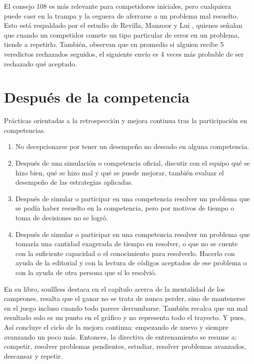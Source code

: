 El consejo 108 es más relevante para competidores iniciales, pero cualquiera puede caer en la trampa y la ceguera de aferrarse a un problema mal resuelto. Esto está respaldado por el estudio de Revilla, Manzoor y Lui \cite{revilla2008}, quienes señalan que cuando un competidor comete un tipo particular de error en un problema, tiende a repetirlo. También, observan que en promedio si alguien recibe 5 veredictos rechazados seguidos, el siguiente envío es 4 veces más probable de ser rechazado qué aceptado.
\pagebreak
\section{Después de la competencia}
Prácticas orientadas a la retrospección y mejora continua tras la participación en competencias.
\begin{enumerate}[resume=icpc]
    \item No decepcionarse por tener un desempeño no deseado en alguna competencia.
    \item Después de una simulación o competencia oficial, discutir con el equipo qué se hizo bien, qué se hizo mal y qué se puede mejorar, también evaluar el desempeño de las estrategias aplicadas.
    \item Después de simular o participar en una competencia resolver un problema que se podía haber resuelto en la competencia, pero por motivos de tiempo o toma de decisiones no se logró.
    \item Después de simular o participar en una competencia resolver un problema que tomaría una cantidad exagerada de tiempo en resolver, o que no se cuente con la suficiente capacidad o el conocimiento para resolverlo. Hacerlo con ayuda de la editorial y con la lectura de códigos aceptados de ese problema o con la ayuda de otra persona que sí lo resolvió.
\end{enumerate}
En su libro, soullless \cite{soullless2025} destaca en el capítulo acerca de la mentalidad de los campeones, resalta que el ganar no se trata de nunca perder, sino de mantenerse en el juego incluso cuando todo parece derrumbarse. También recalca que un mal resultado solo es un punto en el gráfico y no representa todo el trayecto. Y pues, Así concluye el ciclo de la mejora continua: empezando de nuevo y siempre avanzando un poco más. Entonces, la directiva de entrenamiento se resume a: competir, resolver problemas pendientes, estudiar, resolver problemas avanzados, descansar y repetir.
\pagebreak
